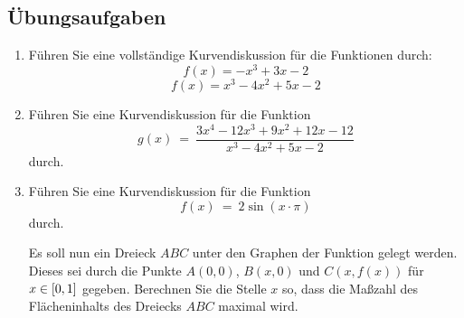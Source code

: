 \subsection{Übungsaufgaben}

\begin{enumerate}
\item
Führen Sie eine vollständige Kurvendiskussion für die Funktionen durch:
\[
f(x)
= -x^3 + 3 x - 2
\]
\[f(x) = x^3 - 4x^2 + 5x -2\]

\item
Führen Sie eine Kurvendiskussion für die Funktion
\[
g(x)
\ =\ \frac{3 x^4 - 12 x^3 + 9 x^2 + 12 x - 12}{x^3 - 4 x^2 + 5 x - 2}
\]
durch.

\item
Führen Sie eine Kurvendiskussion für die Funktion
\[
f(x)
\ =\ 2\sin(x\cdot\pi)
\]
durch.

Es soll nun ein Dreieck $ABC$ unter den Graphen der Funktion gelegt werden.
Dieses sei durch die Punkte $A(0,0)$, $B(x,0)$ und $C(x,f(x))$ für
$x\in[{0},{1}]$ gegeben. Berechnen Sie die Stelle $x$ so, dass die Maßzahl
des Flächeninhalts des Dreiecks $ABC$ maximal wird.
\end{enumerate}